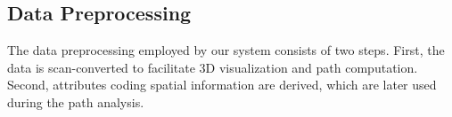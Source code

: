 \documentclass[conference,10pt,letter]{IEEEtran}
\begin{document}
\subsection{Data Preprocessing} \label{sec:overview:preprocessing}
The data preprocessing employed by our system consists of two steps. First, the data is scan-converted to facilitate 3D visualization and path computation. Second, attributes coding spatial information are derived, which are later used during the path analysis.

\begin{figure}
	\centering
	\hfill
	\hfill
\end{figure}
\end{document}
